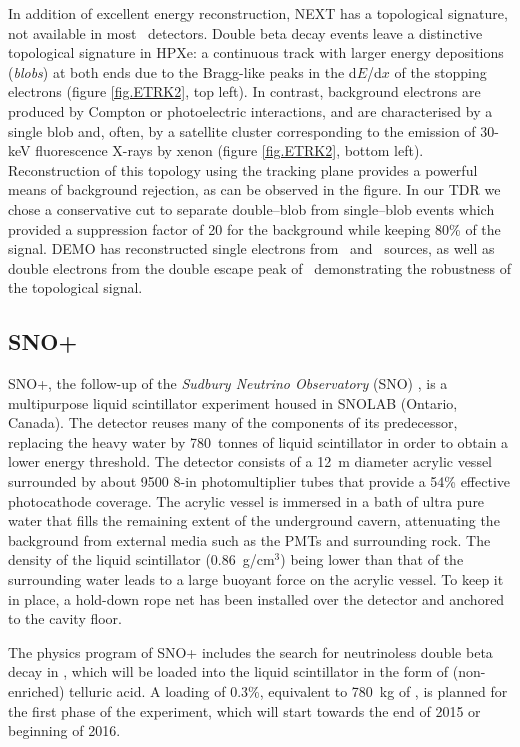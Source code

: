 \documentclass{PoS}
\begin{document}
In addition of excellent energy reconstruction, NEXT has a topological signature, not available in most \bbonu\ detectors. 
Double beta decay events leave a distinctive topological signature in HPXe: a continuous track with larger energy depositions (\emph{blobs}) at both ends due to the Bragg-like peaks in the d$E$/d$x$ of the stopping electrons (figure \ref{fig.ETRK2}, top left). In contrast, background electrons are produced by Compton or photoelectric interactions, and are characterised by a single blob and, often, by a satellite cluster corresponding to the emission of 30-keV fluorescence X-rays by xenon (figure \ref{fig.ETRK2}, bottom left).
Reconstruction of this topology using the tracking plane provides a powerful means of background rejection, as can be observed in the figure. In our TDR we chose a conservative cut to separate double--blob from single--blob events which provided a suppression factor of 20 for the background while keeping 80\% of the signal.  DEMO has reconstructed single electrons from \NA\ and \CS\ sources, as well as double electrons from the double escape peak of \TL\, demonstrating the robustness of the topological signal. 


\subsection{SNO+} \label{subsec:SNO+}
SNO+, the follow-up of the \emph{Sudbury Neutrino Observatory} (SNO) \cite{Boger:1999bb}, is a multipurpose liquid scintillator experiment housed in SNOLAB (Ontario, Canada). The detector reuses many of the components of its predecessor, replacing the heavy water by 780~tonnes of liquid scintillator in order to obtain a lower energy threshold. The detector consists of a 12~m diameter acrylic vessel surrounded by about 9500 8-in photomultiplier tubes that provide a 54\% effective photocathode coverage. The acrylic vessel is immersed in a bath of ultra pure water that fills the remaining extent of the underground cavern, attenuating the background from external media such as the PMTs and surrounding rock. The density of the liquid scintillator (0.86~g/cm$^{3}$) being lower than that of the surrounding water leads to a large buoyant force on the acrylic vessel. To keep it in place, a hold-down rope net has been installed over the detector and anchored to the cavity floor.

The physics program of SNO+ includes the search for neutrinoless double beta decay in \TE, which will be loaded into the liquid scintillator in the form of (non-enriched) telluric acid. A loading of 0.3\%, equivalent to 780~kg of \TE, is planned for the first phase of the experiment, which will start towards the end of 2015 or beginning of 2016. 
\end{document}
